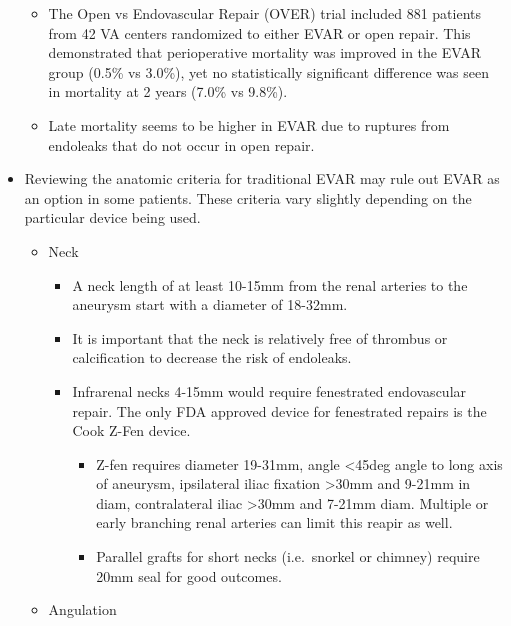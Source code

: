 \documentclass[
]{book}
\begin{document}
\begin{itemize}
  \begin{itemize}
  \item
    The Open vs Endovascular Repair (OVER) trial included 881
    patients from 42 VA centers randomized to either EVAR or open
    repair. This demonstrated that perioperative mortality was
    improved in the EVAR group (0.5\% vs 3.0\%), yet no statistically
    significant difference was seen in mortality at 2 years (7.0\% vs
    9.8\%). \citep{lederleOpenEndovascularRepair2019}
  \item
    Late mortality seems to be higher in EVAR due to ruptures from
    endoleaks that do not occur in open repair.
    \citep{rajendranLateRuptureAbdominal2017}
  \end{itemize}
\item
  Reviewing the anatomic criteria for traditional EVAR may rule out
  EVAR as an option in some patients. These criteria vary slightly
  depending on the particular device being used.

  \begin{itemize}
  \item
    Neck

    \begin{itemize}
    \item
      A neck length of at least 10-15mm from the renal arteries to
      the aneurysm start with a diameter of 18-32mm.
    \item
      It is important that the neck is relatively free of thrombus
      or calcification to decrease the risk of endoleaks.
    \item
      Infrarenal necks 4-15mm would require fenestrated
      endovascular repair. The only FDA approved device for
      fenestrated repairs is the Cook Z-Fen
      device.\citep{oderichResultsUnitedStates2014}

      \begin{itemize}
      \item
        Z-fen requires diameter 19-31mm, angle \textless45deg angle to
        long axis of aneurysm, ipsilateral iliac fixation \textgreater30mm
        and 9-21mm in diam, contralateral iliac \textgreater30mm and
        7-21mm diam. Multiple or early branching renal arteries
        can limit this reapir as well.
        \citep{oderichTechnicalAspectsRepair2014}
      \item
        Parallel grafts for short necks (i.e.~snorkel or
        chimney) require 20mm seal for good outcomes.
        \citep{donasCollectedWorldExperience2015}
      \end{itemize}
    \end{itemize}
  \item
    Angulation


\end{itemize}
\end{itemize}
\end{document}
